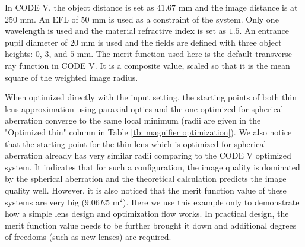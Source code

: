 In CODE V, the object distance is set as $41.67 $ mm and the image distance is at $250 $ mm. An EFL of $50 $ mm is used as a constraint of the system. Only one wavelength is used and the material refractive index is set as $1.5$. An entrance pupil diameter of $20 $ mm is used and the fields are defined with three object heights: $0$, $3$, and $5 $ mm.  The merit function used here is the default transverse-ray function in CODE V. It is a composite value, scaled so that it is the mean square of the weighted image radius.

When optimized directly with the input setting, the starting points of both thin lens approximation using paraxial optics and the one optimized for spherical aberration converge to the same local minimum (radii are given in the "Optimized thin" column in Table \ref{tb: magnifier optimization}). We also notice that the starting point for the thin lens which is optimized for spherical aberration already has very similar radii comparing to the CODE V optimized system. It indicates that for such a configuration, the image quality is dominated by the spherical aberration and the theoretical calculation predicts the image quality well. However, it is also noticed that the merit function value of these systems are very big ($9.06E5$ \textmu m$^{2}$). Here we use this example only to demonstrate how a simple lens design and optimization flow works. In practical design, the merit function value needs to be further brought it down and additional degrees of freedoms (such as new lenses) are required. 


